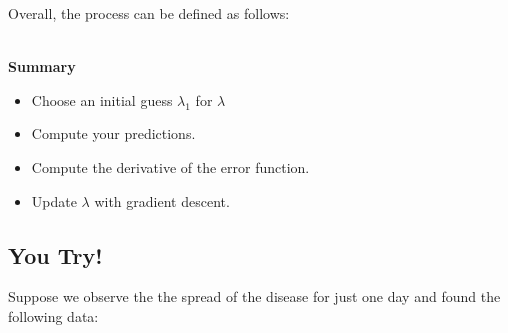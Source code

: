 \documentclass[11pt]{article}
\begin{document}
\begin{enumerate}
Overall, the process can be defined as follows:\\
\vspace{0.5cm}\

\textbf{Summary}
\begin{itemize}
    \item Choose an initial guess $\lambda_1$ for $\lambda$\\
    \item Compute your predictions.
    \item Compute the derivative of the error function.\\
    \item Update $\lambda$ with gradient descent.
\end{itemize}
\end{enumerate}
\newpage
\subsection*{You Try!}

Suppose we observe the the spread of the disease for just one day and found the following data:
\end{document}
